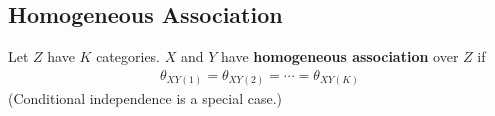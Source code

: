 \documentclass[11pt]{elegantbook}
\begin{document}
\subsection{Homogeneous Association}
\begin{definition}
    Let $Z$ have $K$ categories. $X$ and $Y$ have \textbf{homogeneous association} over $Z$ if
    \begin{equation}
        \begin{aligned}
            \theta_{XY(1)}=\theta_{XY(2)}=\cdots=\theta_{XY(K)}
        \end{aligned}
        \nonumber
    \end{equation}
    (Conditional independence is a special case.)
\end{definition}
\end{document}
